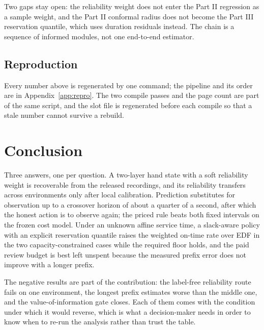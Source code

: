 \documentclass{swmcmthesis}
\begin{document}
Two gaps stay open: the reliability weight does not enter the Part II regression as a
sample weight, and the Part II conformal radius does not become the Part III
reservation quantile, which uses duration residuals instead. The chain is a
sequence of informed modules, not one end-to-end estimator.

\subsection{Reproduction}

Every number above is regenerated by one command; the pipeline and its order are in
Appendix~\ref{app:repro}. The two compile passes and the page count are part of the
same script, and the slot file is regenerated before each compile so that a stale
number cannot survive a rebuild.

\section{Conclusion}
\label{sec:concl}

Three answers, one per question. A two-layer hand state with a soft reliability
weight is recoverable from the released recordings, and its reliability transfers
across environments only after local calibration. Prediction substitutes for
observation up to a crossover horizon of about a quarter of a second, after which
the honest action is to observe again; the priced rule beats both fixed intervals
on the frozen cost model. Under an unknown affine service time, a slack-aware
policy with an explicit reservation quantile raises the weighted on-time rate over
EDF in the two capacity-constrained cases while the required floor holds, and the
paid review budget is best left unspent because the measured prefix error does not
improve with a longer prefix.

The negative results are part of the contribution: the label-free reliability route
fails on one environment, the longest prefix estimates worse than the middle one,
and the value-of-information gate closes. Each of them comes with the condition
under which it would reverse, which is what a decision-maker needs in order to know
when to re-run the analysis rather than trust the table.
\end{document}
